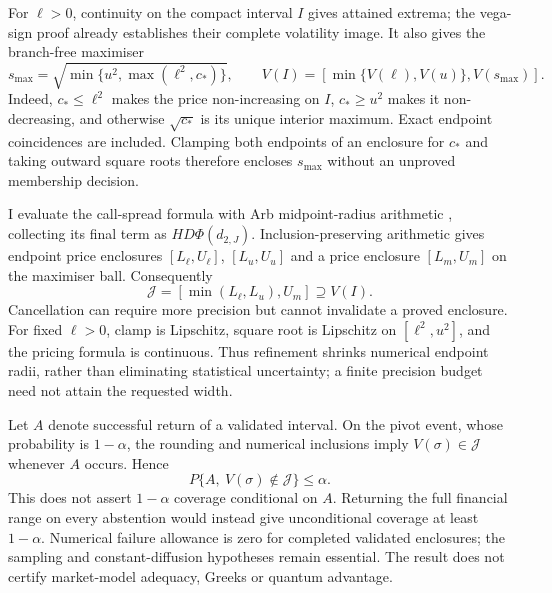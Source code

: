 \documentclass[11pt]{article}
\begin{document}
For $\ell>0$, continuity on the compact interval $I$ gives attained
extrema; the vega-sign proof already establishes their complete
volatility image. It also gives the branch-free maximiser
\begin{equation}
 s_{\max}=\sqrt{\min\{u^2,\max(\ell^2,c_*)\}},\qquad
 V(I)=[\min\{V(\ell),V(u)\},V(s_{\max})].
 \label{eq:cgbm-clamped-maximum}
\end{equation}
Indeed, $c_*\leq\ell^2$ makes the price non-increasing on $I$,
$c_*\geq u^2$ makes it non-decreasing, and otherwise
$\sqrt{c_*}$ is its unique interior maximum. Exact endpoint coincidences
are included. Clamping both endpoints of an enclosure for $c_*$ and
taking outward square roots therefore encloses $s_{\max}$ without an
unproved membership decision.

I evaluate the call-spread formula with Arb midpoint-radius arithmetic
\citep{johansson2017}, collecting its final term as
$H D\Phi(d_{2,J})$. Inclusion-preserving arithmetic gives endpoint
price enclosures $[L_\ell,U_\ell]$, $[L_u,U_u]$ and a price enclosure
$[L_m,U_m]$ on the maximiser ball. Consequently
\begin{equation}
 \mathcal J=[\min(L_\ell,L_u),U_m]\supseteq V(I).
 \label{eq:cgbm-validated-price-image}
\end{equation}
Cancellation can require more precision but cannot invalidate a proved
enclosure. For fixed $\ell>0$, clamp is Lipschitz, square root is
Lipschitz on $[\ell^2,u^2]$, and the pricing formula is continuous.
Thus refinement shrinks numerical endpoint radii, rather than eliminating
statistical uncertainty; a finite precision budget need not attain the
requested width.

Let $A$ denote successful return of a validated interval. On the pivot
event, whose probability is $1-\alpha$, the rounding and numerical
inclusions imply $V(\sigma)\in\mathcal J$ whenever $A$ occurs. Hence
\begin{equation}
 P\{A,\ V(\sigma)\notin\mathcal J\}\leq\alpha.
 \label{eq:cgbm-validated-return-risk}
\end{equation}
This does not assert $1-\alpha$ coverage conditional on $A$.
Returning the full financial range on every abstention would instead
give unconditional coverage at least $1-\alpha$. Numerical failure
allowance is zero for completed validated enclosures; the sampling and
constant-diffusion hypotheses remain essential. The result does not
certify market-model adequacy, Greeks or quantum advantage.
\end{document}
